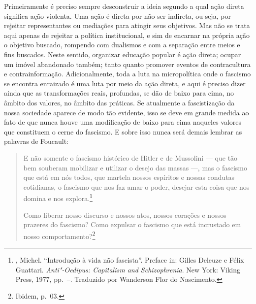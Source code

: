 Primeiramente é preciso sempre desconstruir a ideia segundo a qual ação
direta significa ação violenta. Uma ação é direta por não ser indireta,
ou seja, por rejeitar representantes ou mediações para atingir seus
objetivos. Mas não se trata aqui apenas de rejeitar a política
institucional, e sim de encarnar na própria ação o objetivo buscado,
rompendo com dualismos e com a separação entre meios e fins buscados.
Neste sentido, organizar educação popular é ação direta; ocupar um
imóvel abandonado também; tanto quanto promover eventos de contracultura
e contrainformação. Adicionalmente, toda a luta na micropolítica onde o
fascismo se encontra enraizado é uma luta por meio da ação direta, e aqui
é preciso dizer ainda que as transformações reais, profundas, se dão de
baixo para cima, no âmbito dos valores, no âmbito das práticas. Se
atualmente a fascistização da nossa sociedade aparece de modo tão
evidente, isso se deve em grande medida ao fato de que nunca houve uma
modificação de baixo para cima naqueles valores que constituem o cerne do
fascismo. E sobre isso nunca será demais lembrar as palavras de
Foucault:

\begin{quote}
E não somente o fascismo histórico de Hitler e de Mussolini --- que tão
bem souberam mobilizar e utilizar o desejo das massas ---, mas o fascismo
que está em nós todos, que martela nossos espíritos e nossas condutas
cotidianas, o fascismo que nos faz amar o poder, desejar esta coisa que
nos domina e nos explora.\footnote{, Michel. ``Introdução à
  vida não fascista''. Preface in: Gilles Deleuze e Félix Guattari.
  \emph{Anti"-Oedipus: Capitalism and Schizophrenia}. New York: Viking Press,
  1977, pp.~--. Traduzido por Wanderson Flor do Nascimento.}

Como liberar nosso discurso e nossos atos, nossos corações e nossos
prazeres do fascismo? Como expulsar o fascismo que está incrustado em
nosso comportamento?\footnote{Ibidem, p.~03.}
\end{quote}

